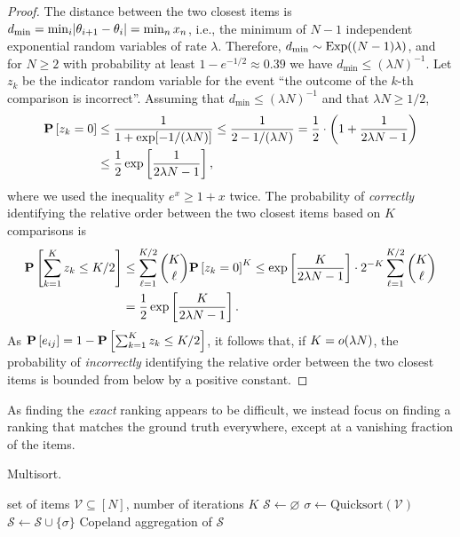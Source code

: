 \begin{proof}
The distance between the two closest items is $d_{\min} = \min_i \lvert\theta_{i+1} - \theta_{i}\rvert = \min_n x_n$, i.e., the minimum of $N-1$ independent exponential random variables of rate $\lambda$.
Therefore, $d_{\min} \sim \mathrm{Exp}( (N-1)\lambda )$, and for $N \ge 2$ with probability at least $1 - e^{-1/2} \approx 0.39$ we have $d_{\min} \le (\lambda N)^{-1}$.
Let $z_k$ be the indicator random variable for the event ``the outcome of the $k$-th comparison is incorrect''.
Assuming that $d_{\min} \le (\lambda N)^{-1}$ and that $\lambda N \ge 1/2$,
\begin{align*}
\mathbf{P}\left[ z_k = 0 \right]
    &\le \frac{1}{1 + \exp[-1 / (\lambda N)]} \le \frac{1}{2 - 1/(\lambda N)}
     = \frac{1}{2} \cdot \left( 1 + \frac{1}{2\lambda N - 1} \right) \\
    &\le \frac{1}{2} \exp \left[ \frac{1}{2\lambda N - 1} \right],
\end{align*}
where we used the inequality $e^{x} \ge 1 + x$ twice.
The probability of \emph{correctly} identifying the relative order between the two closest items based on $K$ comparisons is
\begin{align*}
\mathbf{P}\left[ \sum_{k = 1}^K z_k \le K/2 \right]
    &\le \sum_{\ell = 1}^{K/2} \binom{K}{\ell} \mathbf{P}\left[ z_k = 0 \right]^K
     \le \exp \left[ \frac{K}{2\lambda N - 1} \right] \cdot 2^{-K} \sum_{\ell = 1}^{K/2} \binom{K}{\ell} \\
    &= \frac{1}{2} \exp \left[ \frac{K}{2\lambda N - 1} \right].
\end{align*}
As $\mathbf{P}\left[ e_{ij} \right] = 1 - \mathbf{P}\left[ \sum_{k = 1}^K z_k \le K/2 \right]$, it follows that, if $K = o(\lambda N)$, the probability of \emph{incorrectly} identifying the relative order between the two closest items is bounded from below by a positive constant.
\end{proof}

As finding the \emph{exact} ranking appears to be difficult, we instead focus on finding a ranking that matches the ground truth everywhere, except at a vanishing fraction of the items.

\begin{algorithm}[t]
   \caption{Multisort.}
   \label{rs:alg:multisort}
\begin{algorithmic}[1]
   \Require set of items $\mathcal{V} \subseteq [N]$, number of iterations $K$
   \State $\mathcal{S} \gets \varnothing$
     \State $\sigma \gets \text{Quicksort}(\mathcal{V})$
     \State $\mathcal{S} \gets \mathcal{S} \cup \{ \sigma \}$
   \EndFor
   \State \Return Copeland aggregation of $\mathcal{S}$
\end{algorithmic}
\end{algorithm}

